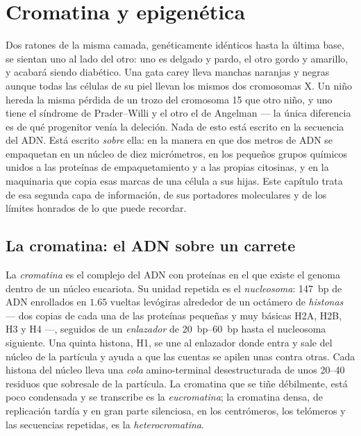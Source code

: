 \chapter{Cromatina y epigenética}\label{ch:b3:chromatin-epigenetics}

Dos ratones de la misma camada, genéticamente idénticos hasta la última
base, se sientan uno al lado del otro: uno es delgado y pardo, el otro
gordo y amarillo, y acabará siendo diabético. Una gata carey lleva
manchas naranjas y negras aunque todas las células de su piel llevan los
mismos dos cromosomas X. Un niño hereda la misma pérdida de un trozo del
cromosoma 15 que otro niño, y uno tiene el síndrome de Prader--Willi y el
otro el de Angelman --- la única diferencia es de qué progenitor venía la
deleción. Nada de esto está escrito en la secuencia del ADN. Está escrito
\emph{sobre} ella: en la manera en que dos metros de ADN se empaquetan en
un núcleo de diez micrómetros, en los pequeños grupos químicos unidos a
las proteínas de empaquetamiento y a las propias citosinas, y en la
maquinaria que copia esas marcas de una célula a sus hijas. Este capítulo
trata de esa segunda capa de información, de sus portadores moleculares y
de los límites honrados de lo que puede recordar.

\section{La cromatina: el ADN sobre un carrete}

\begin{definition}\label{def:b3:chromatin-epigenetics:nucleosome}
La \emph{cromatina} es el complejo del ADN con proteínas en el que existe
el genoma dentro de un núcleo eucariota. Su unidad repetida es el
\emph{nucleosoma}: \qty{147}{bp} de ADN enrollados en $1.65$ vueltas
levógiras alrededor de un octámero de \emph{histonas} --- dos copias de
cada una de las proteínas pequeñas y muy básicas H2A, H2B, H3 y H4 ---,
seguidos de un \emph{enlazador} de \qtyrange{20}{60}{bp} hasta el
nucleosoma siguiente. Una quinta histona, H1, se une al enlazador donde
entra y sale del núcleo de la partícula y ayuda a que las cuentas se
apilen unas contra otras. Cada histona del núcleo lleva una \emph{cola}
amino-terminal desestructurada de unos \numrange{20}{40} residuos que
sobresale de la partícula. La cromatina que se tiñe débilmente, está poco
condensada y se transcribe es la \emph{eucromatina}; la cromatina densa,
de replicación tardía y en gran parte silenciosa, en los centrómeros, los
telómeros y las secuencias repetidas, es la \emph{heterocromatina}.
\end{definition}

